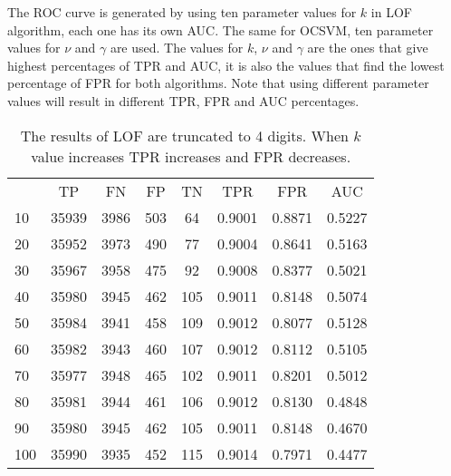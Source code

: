 The ROC curve is generated by using ten parameter values for $k$ in LOF algorithm, each one has its own AUC. The same for OCSVM, ten parameter values for $\nu$ and $\gamma$ are used. The values for $k$, $\nu$ and $\gamma$ are the ones that give highest percentages of TPR and AUC, it is also the values that find the lowest percentage of FPR for both algorithms. Note that using different parameter values will result in different TPR, FPR and AUC percentages.
\begin{table}[H]
\centering
\begin{tabular}{|l|c|c|c|c|c|c|l|}
\hline
\rowcolor[HTML]{9B9B9B} 
\multicolumn{8}{|c|}{\cellcolor[HTML]{9B9B9B}\textbf{LOF}}                                                                                      \\ \hline
\rowcolor[HTML]{C0C0C0} 
\multicolumn{1}{|c|}{\cellcolor[HTML]{C0C0C0}$k$} & TP    & FN   & FP  & TN  & TPR    & FPR    & \multicolumn{1}{c|}{\cellcolor[HTML]{C0C0C0}AUC} \\ \hline
10                                              & 35939 & 3986 & 503 & 64  & 0.9001 & 0.8871 & 0.5227                                           \\ \hline
20                                              & 35952 & 3973 & 490 & 77  & 0.9004 & 0.8641 & 0.5163                                           \\ \hline
30                                              & 35967 & 3958 & 475 & 92  & 0.9008 & 0.8377 & 0.5021                                           \\ \hline
40                                              & 35980 & 3945 & 462 & 105 & 0.9011 & 0.8148 & 0.5074                                           \\ \hline
50                                              & 35984 & 3941 & 458 & 109 & 0.9012 & 0.8077 & 0.5128                                           \\ \hline
60                                              & 35982 & 3943 & 460 & 107 & 0.9012 & 0.8112 & 0.5105                                           \\ \hline
70                                              & 35977 & 3948 & 465 & 102 & 0.9011 & 0.8201 & 0.5012                                           \\ \hline
80                                              & 35981 & 3944 & 461 & 106 & 0.9012 & 0.8130 & 0.4848                                           \\ \hline
90                                              & 35980 & 3945 & 462 & 105 & 0.9011 & 0.8148 & 0.4670                                           \\ \hline
100                                             & 35990 & 3935 & 452 & 115 & 0.9014 & 0.7971 & 0.4477                                           \\ \hline
\end{tabular}
\vspace{1em}
\caption{The results of LOF are truncated to 4 digits. When $k$ value increases TPR increases and FPR decreases.}\label{tab:myLOF}
\end{table}

